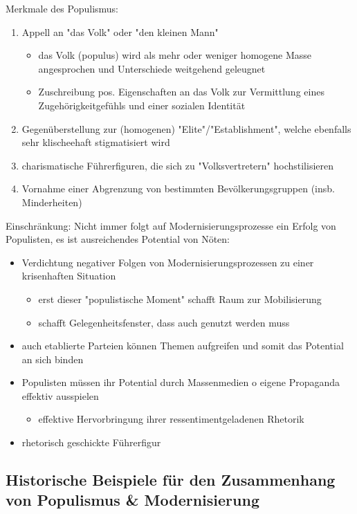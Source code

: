 \documentclass[11pt]{article}
\begin{document}
Merkmale des Populismus:
\begin{enumerate}
\item Appell an "das Volk" oder "den kleinen Mann"
\begin{itemize}
\item das Volk (populus) wird als mehr oder weniger homogene Masse angesprochen und Unterschiede weitgehend geleugnet
\item Zuschreibung pos. Eigenschaften an das Volk zur Vermittlung eines Zugehörigkeitgefühls und einer sozialen Identität
\end{itemize}
\item Gegenüberstellung zur (homogenen) "Elite"/"Establishment", welche ebenfalls sehr klischeehaft stigmatisiert wird
\item charismatische Führerfiguren, die sich zu "Volksvertretern" hochstilisieren
\item Vornahme einer Abgrenzung von bestimmten Bevölkerungsgruppen (insb. Minderheiten)
\end{enumerate}

Einschränkung: Nicht immer folgt auf Modernisierungsprozesse ein Erfolg von Populisten, es ist ausreichendes Potential von Nöten:
\begin{itemize}
\item Verdichtung negativer Folgen von Modernisierungsprozessen zu einer krisenhaften Situation
\begin{itemize}
\item erst dieser "populistische Moment" schafft Raum zur Mobilisierung
\item schafft Gelegenheitsfenster, dass auch genutzt werden muss
\end{itemize}
\item auch etablierte Parteien können Themen aufgreifen und somit das Potential an sich binden
\item Populisten müssen ihr Potential durch Massenmedien o eigene Propaganda effektiv ausspielen
\begin{itemize}
\item effektive Hervorbringung ihrer ressentimentgeladenen Rhetorik
\end{itemize}
\item rhetorisch geschickte Führerfigur
\end{itemize}
\subsection{Historische Beispiele für den Zusammenhang von Populismus \& Modernisierung}
\label{sec:orgb34433c}
\end{document}
